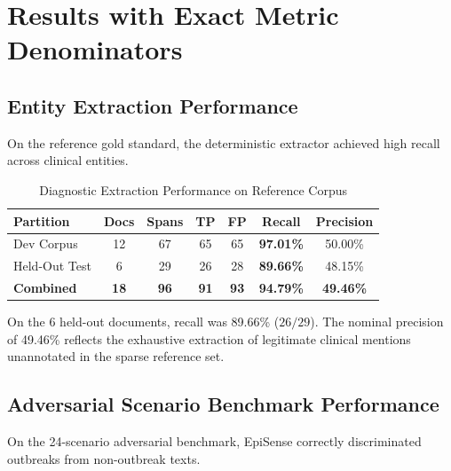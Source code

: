 \documentclass[conference]{IEEEtran}
\begin{document}
\section{Results with Exact Metric Denominators}
\subsection{Entity Extraction Performance}
On the reference gold standard, the deterministic extractor achieved high recall across clinical entities.

\begin{table}[htbp]
\caption{Diagnostic Extraction Performance on Reference Corpus}
\label{tab:extraction}
\begin{center}
\begin{tabular}{lcccccc}
\toprule
\textbf{Partition} & \textbf{Docs} & \textbf{Spans} & \textbf{TP} & \textbf{FP} & \textbf{Recall} & \textbf{Precision} \\
\midrule
Dev Corpus & 12 & 67 & 65 & 65 & \textbf{97.01\%} & 50.00\% \\
Held-Out Test & 6 & 29 & 26 & 28 & \textbf{89.66\%} & 48.15\% \\
\textbf{Combined} & \textbf{18} & \textbf{96} & \textbf{91} & \textbf{93} & \textbf{94.79\%} & \textbf{49.46\%} \\
\bottomrule
\end{tabular}
\end{center}
\end{table}

On the 6 held-out documents, recall was 89.66\% ($26/29$). The nominal precision of 49.46\% reflects the exhaustive extraction of legitimate clinical mentions unannotated in the sparse reference set.

\subsection{Adversarial Scenario Benchmark Performance}
On the 24-scenario adversarial benchmark, EpiSense correctly discriminated outbreaks from non-outbreak texts.
\end{document}
